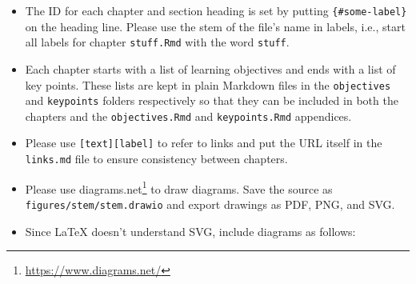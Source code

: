 \documentclass[
]{krantz}
\renewcommand{\href}[2]{#2\footnote{\url{#1}}}
\begin{document}
\begin{itemize}
\item
  The ID for each chapter and section heading is set by putting
  \texttt{\{\#some-label\}} on the heading line. Please use the stem of the file's name in
  labels, i.e., start all labels for chapter \texttt{stuff.Rmd} with the word \texttt{stuff}.
\item
  Each chapter starts with a list of learning objectives and ends with a list
  of key points. These lists are kept in plain Markdown files in the
  \texttt{objectives} and \texttt{keypoints} folders respectively so that they can be
  included in both the chapters and the \texttt{objectives.Rmd} and \texttt{keypoints.Rmd}
  appendices.
\item
  Please use \texttt{{[}text{]}{[}label{]}} to refer to links and put the URL itself in the
  \texttt{links.md} file to ensure consistency between chapters.
\item
  Please use \href{https://www.diagrams.net/}{diagrams.net} to draw diagrams. Save
  the source as \texttt{figures/stem/stem.drawio} and export drawings as PDF, PNG,
  and SVG.
\item
  Since LaTeX doesn't understand SVG, include diagrams as follows:


\end{itemize}
\end{document}
